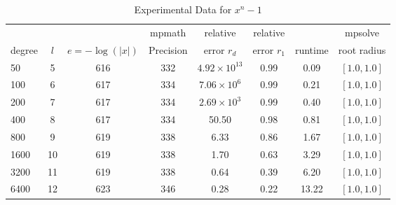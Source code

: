 \documentclass[sigconf]{acmart}
\begin{document}
\begin{table}[t]
\caption{Experimental Data for $x^n - 1$}
\label{tab:nroots}
\vskip 0.15in
\begin{center}
\begin{small}
\begin{sc}
\begin{tabular}{lccccccc}
\toprule
&  &  & mpmath & relative  & relative &  & mpsolve \\
degree  & $l$& $e=-\log(|x|)$& Precision &error $r_d$       & error $r_1$ &runtime& root radius\\
\midrule
    50 & 5 & 616 & 332 & $4.92 \times 10^{13}$  & 0.99 & 0.09 & $[1.0, 1.0]$ \\
  100 & 6 & 617 & 334 & $ 7.06 \times 10^{6}$ & 0.99 & 0.21 & $[1.0, 1.0]$ \\%
  200 & 7 & 617 & 334 & $ 2.69 \times 10^{3}$ & 0.99 & 0.40 & $[1.0, 1.0]$ \\
  400 & 8 & 617 & 334 & 50.50 & 0.98 & 0.81 & $[1.0, 1.0]$ \\
  800 & 9 &  619 & 338 & 6.33 & 0.86 & 1.67 & $[1.0, 1.0]$ \\
1600 &10& 619 & 338 & 1.70 & 0.63 & 3.29 & $[1.0, 1.0]$ \\
3200 &11& 619 & 338 & 0.64 & 0.39 & 6.20 & $[1.0, 1.0]$ \\
6400 &12& 623 & 346 & 0.28 & 0.22 & 13.22 & $[1.0, 1.0]$ \\
\bottomrule
\end{tabular}
\end{sc}
\end{small}
\end{center}
\vskip -0.1in
\end{table}
\end{document}
